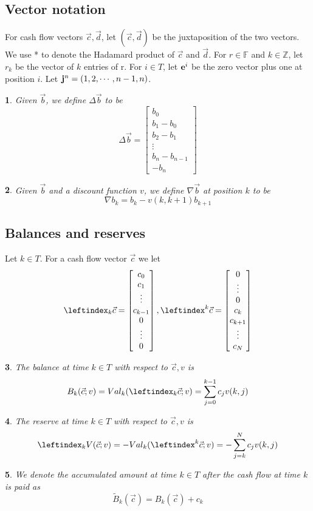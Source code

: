 \documentclass{article}
\newtheorem*{defn}{}
\begin{document}
\subsection{Vector notation}
For cash flow vectors $\vec{c},\vec{d}$, let $(\vec{c},\vec{d})$ be the juxtaposition of the two vectors. We use * to denote the Hadamard product of $\vec{c}$ and $\vec{d}$. For $r \in \mathbb{F}$ and $k \in \mathbb{Z}$, let $r_k$ be the vector of $k$ entries of r. For $i \in T$, let $\bold{e}^i$ be the zero vector plus one at position $i$. Let $\bold{j}^n = (1,2,\cdots,n-1,n)$.
\begin{defn}
Given $\vec{b}$, we define $\Delta \vec{b}$ to be
$$
\Delta{\vec{b}} =
\begin{bmatrix}
b_0 \\
b_1 - b_0 \\
b_2 - b_1 \\
\vdots \\
b_n - b_{n-1} \\
-b_n
\end{bmatrix}
$$
\end{defn}
\begin{defn}
Given $\vec{b}$ and a discount function $v$, we define $\nabla \vec{b}$ at position $k$ to be
$$
\nabla b_k = b_k - v(k, k+1)b_{k+1}
$$
\end{defn}
\subsection{Balances and reserves}
Let $k \in T$. For a cash flow vector $\vec{c}$ we let
$$
\leftindex_k{\vec{c}} =
\begin{bmatrix}
c_0 \\
c_1 \\
\vdots \\
c_{k-1} \\
0 \\
\vdots \\
0
\end{bmatrix},
\leftindex^k{\vec{c}} =
\begin{bmatrix}
0 \\
\vdots \\
0 \\
c_k \\
c_{k+1} \\
\vdots \\
c_N
\end{bmatrix}
$$
\begin{defn}
The balance at time $k \in T$ with respect to $\vec{c},v$ is
$$
B_k(\vec{c};v) = Val_k(\leftindex_k{\vec{c}};v)=\sum_{j=0}^{k-1} {c_j v(k,j)}
$$
\end{defn}
\begin{defn}
The reserve at time $k \in T$ with respect to $\vec{c},v$ is
$$
\leftindex_k{V}(\vec{c};v) = -Val_k(\leftindex^k{\vec{c}};v)=-\sum_{j=k}^{N} {c_j v(k,j)}
$$
\end{defn}
\begin{defn}
We denote the accumulated amount at time $k \in T$ after the cash flow at time $k$ is paid as
$$
\tilde{B}_k(\vec{c})=B_k(\vec{c})+c_k
$$
\end{defn}
\end{document}
